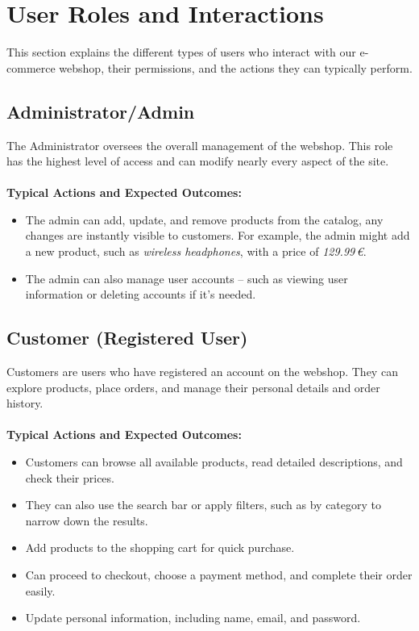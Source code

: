 \documentclass[a4paper,12pt]{article}
\begin{document}
	\section{User Roles and Interactions}
	This section explains the different types of users who interact with our e-commerce webshop, their permissions, and the actions they can typically perform.
	\subsection*{Administrator/Admin}
	The Administrator oversees the overall management of the webshop. This role has the highest level of access and can modify nearly every aspect of the site. \\ \\
	\textbf{Typical Actions and Expected Outcomes:}
	\begin{itemize}
		\item The admin can add, update, and remove products from the catalog, any changes are instantly visible to customers. For example, the admin might add a new product, such as  \textit{wireless headphones}, with a price of \textit{129.99\,€}.
		\item The admin can also manage user accounts – such as viewing user \\ information or deleting accounts if it's needed.
	\end{itemize}








	\subsection*{Customer (Registered User)}
	Customers are users who have registered an account on the webshop. They can explore products, place orders, and manage their personal details and order history. \\ \\
	\textbf{Typical Actions and Expected Outcomes:}
	\begin{itemize}
  		\item Customers can browse all available products, read detailed descriptions, and check their prices.
    		\item They can also use the search bar or apply filters, such as by category to narrow down the results.
    		\item Add products to the shopping cart for quick purchase.
    		\item Can proceed to checkout, choose a payment method, and complete their order easily.
    		\item Update personal information, including name, email, and password.
	\end{itemize}
\end{document}
